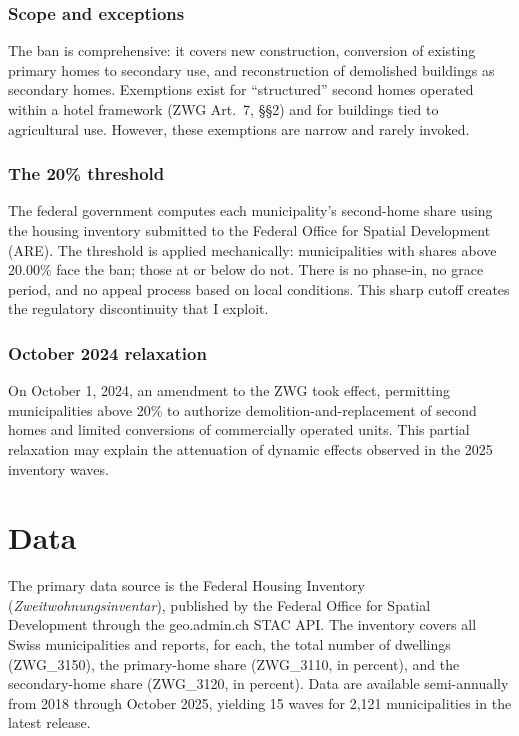 \documentclass[12pt]{article}
\begin{document}
\subsubsection*{Scope and exceptions} The ban is comprehensive: it covers new construction, conversion of existing primary homes to secondary use, and reconstruction of demolished buildings as secondary homes. Exemptions exist for ``structured'' second homes operated within a hotel framework (ZWG Art.~7, \S\S{}2) and for buildings tied to agricultural use. However, these exemptions are narrow and rarely invoked.

\subsubsection*{The 20\% threshold} The federal government computes each municipality's second-home share using the housing inventory submitted to the Federal Office for Spatial Development (ARE). The threshold is applied mechanically: municipalities with shares above 20.00\% face the ban; those at or below do not. There is no phase-in, no grace period, and no appeal process based on local conditions. This sharp cutoff creates the regulatory discontinuity that I exploit.

\subsubsection*{October 2024 relaxation} On October 1, 2024, an amendment to the ZWG took effect, permitting municipalities above 20\% to authorize demolition-and-replacement of second homes and limited conversions of commercially operated units. This partial relaxation may explain the attenuation of dynamic effects observed in the 2025 inventory waves.

\section{Data}

The primary data source is the Federal Housing Inventory (\textit{Zweitwohnungsinventar}), published by the Federal Office for Spatial Development through the geo.admin.ch STAC API. The inventory covers all Swiss municipalities and reports, for each, the total number of dwellings (ZWG\_3150), the primary-home share (ZWG\_3110, in percent), and the secondary-home share (ZWG\_3120, in percent). Data are available semi-annually from 2018 through October 2025, yielding 15 waves for 2,121 municipalities in the latest release.
\end{document}
